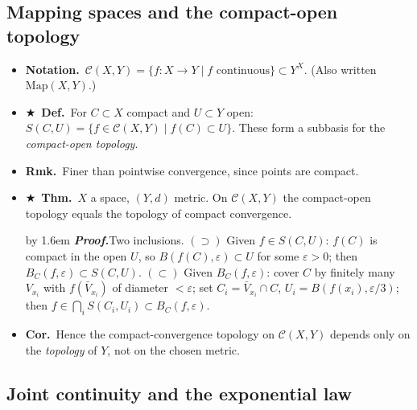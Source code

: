 \documentclass[12pt,a4paper]{article}
\newcommand{\Dfn}{\textbf{Def.}~}
\newcommand{\Thm}{\textbf{Thm.}~}
\newcommand{\Cor}{\textbf{Cor.}~}
\newcommand{\Rmk}{\textbf{Rmk.}~}
\newcommand{\Ntn}{\textbf{Notation.}~}
\newcommand{\Key}{$\bigstar$~}                  %
\newcommand{\Pf}[1]{%
  \par\addvspace{7pt}\nopagebreak
  \begingroup
    \advance\leftskip by 1.6em
    \parindent=0pt \small\color{prf}%
    \textbf{\textit{Proof.}}\enspace #1\par
  \endgroup
  \addvspace{9pt}}
\newenvironment{BL}%
  {\begin{itemize}[leftmargin=1.4em,labelsep=0.55em,itemsep=11pt,topsep=11pt,parsep=0pt]}%
  {\end{itemize}}
\newcommand{\Map}{\mathscr{C}}
\begin{document}
\subsection{Mapping spaces and the compact-open topology}

\begin{BL}
\item \Ntn $\Map(X,Y)=\{f\colon X\to Y\mid f\text{ continuous}\}\subset Y^X$.
      (Also written $\mathrm{Map}(X,Y)$.)
\item \Key\Dfn For $C\subset X$ compact and $U\subset Y$ open:
      \(S(C,U)=\{f\in\Map(X,Y)\mid f(C)\subset U\}.\)
      These form a subbasis for the \emph{compact-open topology}.
\item \Rmk Finer than pointwise convergence, since points are compact.
\item \Key\Thm $X$ a space, $(Y,d)$ metric. On $\Map(X,Y)$ the compact-open topology equals
      the topology of compact convergence.
\Pf{Two inclusions.
$(\supset)$ Given $f\in S(C,U)$: $f(C)$ is compact in the open $U$, so
$B(f(C),\varepsilon)\subset U$ for some $\varepsilon>0$; then $B_C(f,\varepsilon)\subset S(C,U)$.
$(\subset)$ Given $B_C(f,\varepsilon)$: cover $C$ by finitely many $V_{x_i}$ with
$f(\bar V_{x_i})$ of diameter $<\varepsilon$; set $C_i=\bar V_{x_i}\cap C$, $U_i=B(f(x_i),\varepsilon/3)$;
then $f\in\bigcap_i S(C_i,U_i)\subset B_C(f,\varepsilon)$.}
\item \Cor Hence the compact-convergence topology on $\Map(X,Y)$ depends only on the
      \emph{topology} of $Y$, not on the chosen metric.
\end{BL}

\subsection{Joint continuity and the exponential law}
\end{document}
